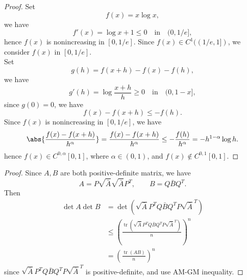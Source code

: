 \documentclass[a4paper]{article}
\DeclarePairedDelimiter{\abs}\lvert\rvert
\DeclareMathOperator{\tr}{tr}
\begin{document}
\begin{proof}
Set
\begin{equation*}
f(x) = x\log{x},
\end{equation*}
we have
\begin{equation*}
f'(x) = \log{x} + 1 \leq 0 \quad \text{in} \quad (0, 1/e], 
\end{equation*}
hence $f(x)$ is nonincreasing in $[0, 1/e]$. Since $f(x) \in C^1((1/e, 1])$, we consider $f(x)$ in $[0, 1/e]$. \\
Set
\begin{equation*}
g(h) = f( x + h ) - f(x) - f(h),
\end{equation*}
we have
\begin{equation*}
g'(h) = \log{\frac{x+h}{h}} \geq 0 \quad \text{in} \quad (0, 1-x],
\end{equation*}
since $g(0)=0$, we have
\begin{equation*}
f(x) - f(x + h) \leq -f(h).
\end{equation*}
Since $f(x)$ is nonincreasing in $[0, 1/e]$, we have
\begin{equation*}
\abs{\frac{f(x)-f(x+h)}{h^\alpha}} = \frac{f(x)-f(x+h)}{h^\alpha} \leq -\frac{f(h)}{h^\alpha} = -h^{1-\alpha}\log{h}.
\end{equation*}
hence $f(x) \in C^{0,\alpha}[0,1]$, where $\alpha \in (0,1)$, and $f(x) \notin C^{0,1}[0,1]$.
\end{proof}
\begin{proof}
Since $A,B$ are both positive-definite matrix, we have
\begin{equation*}
A = P\sqrt{\bar{A}}\sqrt{\bar{A}}P^T, \qquad B = Q\bar{B}Q^T.
\end{equation*}
Then
\begin{align*}
\det{A}\det{B} &= \det{(\sqrt{\bar{A}}P^TQ\bar{B}Q^TP\sqrt{\bar{A}}^T)} \\
&\leq \left( \frac{\tr{(\sqrt{\bar{A}}P^TQ\bar{B}Q^TP\sqrt{\bar{A}}^T)}}{n} \right)^n \\
&= \left( \frac{\tr{(AB)}}{n} \right)^n
\end{align*}
since $\sqrt{\bar{A}}P^TQ\bar{B}Q^TP\sqrt{\bar{A}}^T$ is positive-definite, and use AM-GM inequality.
\end{proof}
\setcounter{proof}{11}
\end{document}
